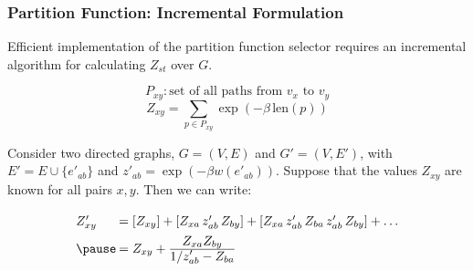 \begin{frame}
   \frametitle{Partition Function: Incremental Formulation}
   
   Efficient implementation of the partition function selector
   requires an incremental algorithm for calculating $Z_{st}$ over $G$.
   
   \begin{equation*}
      P_{xy}: \mbox{set of all paths from $v_x$ to $v_y$}
   \end{equation*}
   \begin{equation*}
      Z_{xy} = \sum_{p \in P_{xy}} \exp( - \beta \, \mbox{len}(p) )
   \end{equation*}
   
   \pause
   Consider two directed graphs, $G=(V,E)$ and $G'=(V,E')$,
   with $E' = E \cup \{ e'_{ab} \}$
   and $z'_{ab} = \exp(-\beta w(e'_{ab}))$.
   Suppose that the values $Z_{xy}$ are known for all pairs $x,y$.
   Then we can write:
   \pause
   \begin{equation*}
      \arraycolsep=1pt
      \def\arraystretch{1.8}
      \begin{array}{ll}
      Z'_{xy}
         & = \left[ Z_{xy} \right]
         + \left[ Z_{xa} \, z'_{ab} \, Z_{by} \right]
         + \left[ Z_{xa} \, z'_{ab} \, Z_{ba} \, z'_{ab} \, Z_{by} \right]
         + \dots \\
      \pause
      & = Z_{xy} + \frac{\displaystyle Z_{xa} Z_{by}}{\displaystyle 1 / z'_{ab} - Z_{ba}}
      \end{array}
   \end{equation*}
   
\end{frame}

